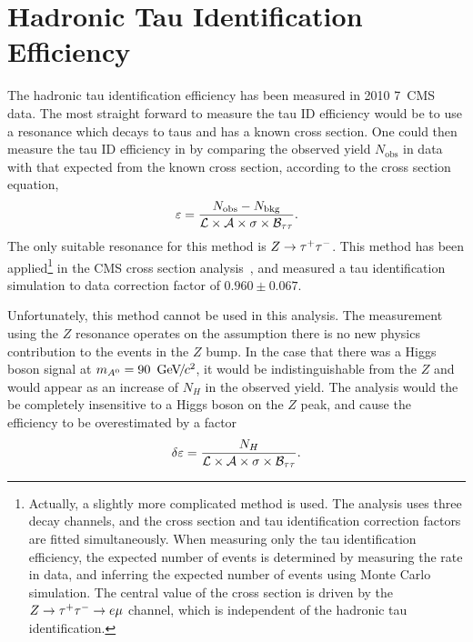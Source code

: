 \section{Hadronic Tau Identification Efficiency}
\label{sec:HadTauIdEff}
%
The hadronic tau identification efficiency has been measured in 2010 7~\TeV CMS
data.  The most straight forward to measure the tau ID efficiency would be to
use a resonance which decays to taus and has a known cross section.  One could
then measure the tau ID efficiency in by comparing the observed yield
$N_\text{obs}$ in data with that expected from the known cross section,
according to the cross section equation,
\begin{equation}
  \varepsilon = \frac{N_\text{obs} - N_\text{bkg}}
  {\mathcal{L} \times \mathcal{A} \times \mbox{\ensuremath{\sigma \times {\cal B}_{\tau\tau}}}}.
  \nonumber
\end{equation}
The only suitable resonance for this method is $Z\to\tau^+\tau^-$.  This method has been
applied\footnote{Actually, a slightly more complicated method is used. The
analysis uses three decay channels, and the \ZTT cross section and tau
identification correction factors are fitted simultaneously. When measuring only
the tau identification efficiency, the expected number
of \ZTT events is determined by measuring the \ZMM rate in data, and inferring the
expected number of \ZTT events using Monte Carlo simulation. 
The central value
of the \ZTT cross section is driven by the $\mbox{\ensuremath{Z\to\tau^+\tau^-}} \to e \mu$ channel, which is
independent of the hadronic tau identification.} in the CMS \ZTT cross section
analysis~\cite{CMS-PAS-EWK-10-013}, and measured a tau identification simulation
to data correction factor of \mbox{$0.960 \pm 0.067$}.

Unfortunately, this method cannot be used in this analysis.  The measurement
using the $Z$ resonance operates on the assumption there is no new physics
contribution to the events in the $Z$ bump.  In the case that there was a Higgs
boson signal at $m_{A^0} = 90~{\,\text{Ge\hspace{-.08em}V\hspace{-0.16em}/\hspace{-0.08em}}c^\text{2}}$, it would be indistinguishable from the $Z$ and
would appear as an increase of $N_{H}$ in the observed yield.  The analysis
would the be completely insensitive to a Higgs boson on the $Z$ peak, and cause
the efficiency to be overestimated by a factor 
\begin{equation}
  \delta \varepsilon = \frac{N_H}
  {\mathcal{L} \times \mathcal{A} \times \mbox{\ensuremath{\sigma \times {\cal B}_{\tau\tau}}}}.
  \nonumber
\end{equation}

